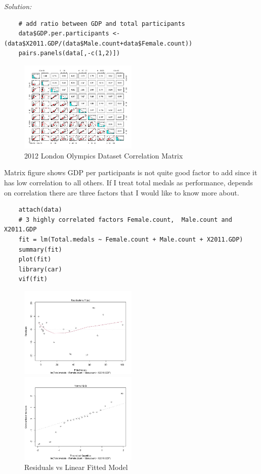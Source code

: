 \documentclass{article}
\newenvironment{solution}
    {\textit{Solution:}}
    {}
\begin{document}
\begin{solution}
\begin{lstlisting}
	# add ratio between GDP and total participants
	data$GDP.per.participants <- (data$X2011.GDP/(data$Male.count+data$Female.count))
	pairs.panels(data[,-c(1,2)])
	\end{lstlisting}
	\begin{figure}[h]
		\centering
		\includegraphics[width=0.5\textwidth]{figure2_Rplot.jpeg}
		\caption{2012 London Olympics Dataset Correlation Matrix}
	\end{figure}
Matrix figure shows GDP per participants is not quite good factor to add since it has low correlation to all others. If I treat total medals as performance, depends on correlation there are three factors that I would like to know more about.
	\begin{lstlisting}
	attach(data)
	# 3 highly correlated factors Female.count,  Male.count and X2011.GDP
	fit = lm(Total.medals ~ Female.count + Male.count + X2011.GDP)
	summary(fit)
	plot(fit)
	library(car)
	vif(fit)
	\end{lstlisting}
\newpage
	\begin{figure}[h]
		\centering
		\includegraphics[width=0.5\textwidth]{figure3_Rplot.jpeg}
		\caption{Residuals vs Linear Fitted Model}
		\includegraphics[width=0.5\textwidth]{figure4_Rplot.jpeg}

\end{figure}
\end{solution}
\end{document}
